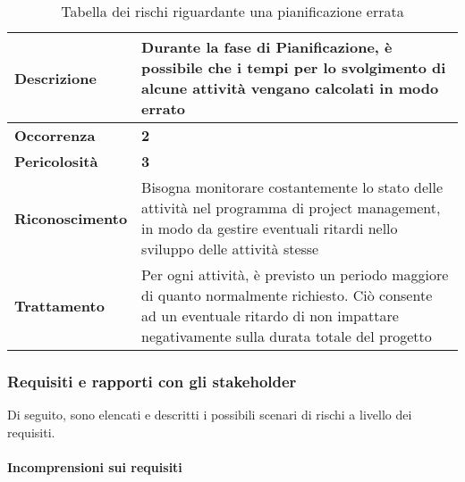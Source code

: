 \begin{table}[H]
	\begin{center}
		\begin{tabular}{|>{\centering\arraybackslash} m{3cm}  ||>{\centering\arraybackslash} m{10cm}|}
			\hline
			\textbf{Descrizione}	& Durante la fase di Pianificazione, è possibile che i tempi per lo svolgimento di alcune attività vengano calcolati in modo errato \\
			\hline
			\textbf{Occorrenza}	&	\textbf{2}	\\
			\hline
			\textbf{Pericolosità}	&	\textbf{3}	\\
			\hline
			\textbf{Riconoscimento}	&	Bisogna monitorare costantemente lo stato delle attività nel programma di project management, in modo da gestire eventuali ritardi nello sviluppo delle attività stesse	\\
			\hline
			\textbf{Trattamento}	&	Per ogni attività, è previsto un periodo maggiore di quanto normalmente richiesto. Ciò consente ad un eventuale ritardo di non impattare negativamente sulla durata totale del progetto	\\
			\hline
		\end{tabular}
		\caption{Tabella dei rischi riguardante una pianificazione errata}
	\end{center}
\end{table}

\subsubsection{Requisiti e rapporti con gli stakeholder}

Di seguito, sono elencati e descritti i possibili scenari di rischi a livello dei requisiti.

\paragraph{Incomprensioni sui requisiti}

